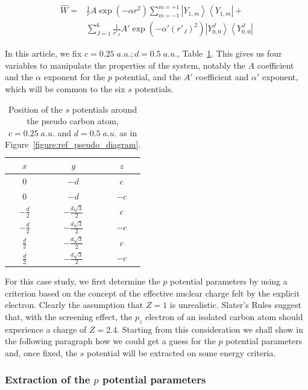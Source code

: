 \documentclass[aip]{revtex4-1}
\begin{document}
\begin{align}
\label{eq:ourPP}
\hat{W} =&
\frac{1}{r} A\exp(-\alpha r^2)\sum_{m=-1}^{m=+1}\left|Y_{1,m}\right>\left<Y_{1,m}\right|%
+\\
&\sum_{J=1}^{6} \frac{1}{r'_J} A'\exp(-\alpha' (r'_J)^2)\left|Y_{0,0}^J\right>\left<Y_{0,0}^J\right|%
\nonumber
\end{align}

In this article, we fix \(c = 0.25\;a.u.; d=0.5\;a.u.\), Table~\ref{tab:pos}.
This gives us four variables to manipulate the properties of the system, 
notably the $A$ coefficient and the $\alpha$ exponent for the $p$ potential, and
the $A'$ coefficient and $\alpha'$ exponent, which will be common to the six $s$ potentials.

\begin{table}[ht]
\caption{\label{tab:pos}Position of the $s$ potentials around the pseudo carbon atom, $c=0.25\;a.u.$ and $d=0.5\;a.u.$ as in Figure~\ref{figure:ref_pseudo_diagram}.
}
\begin{tabular}{ccc}
\hline\hline
 $x$ & $y$ & $z$                                       \\
\hline
$0$            & $-d$                   &  $ c$ \\
$0$            & $-d$                   &  $-c$ \\
$-\frac{d}{2}$ & $-\frac{d\sqrt{3}}{2}$ &  $ c$ \\
$-\frac{d}{2}$ & $-\frac{d\sqrt{3}}{2}$ &  $-c$ \\
$\frac{d}{2}$  & $-\frac{d\sqrt{3}}{2}$ &  $ c$ \\
$\frac{d}{2}$  & $-\frac{d\sqrt{3}}{2}$ &  $-c$ \\
\hline\hline
\end{tabular}
\end{table}

For this case study, we first determine the $p$ potential parameters by using a criterion based 
on the concept of the effective nuclear charge felt by the explicit electron.
Clearly the assumption that \(Z = 1\) is unrealistic.
Slater's Rules\cite{slatersrules} suggest that, with the screening effect, the \(p_{z}\)
electron of an isolated carbon atom should experience a charge of \(Z = 2.4\). Starting
from this consideration we shall show in the following paragraph how we could get
a guess for the  $p$ potential parameters and, once fixed,
the $s$ potential will be extracted on some energy criteria.


\subsubsection{Extraction of the $p$ potential parameters}
\end{document}
